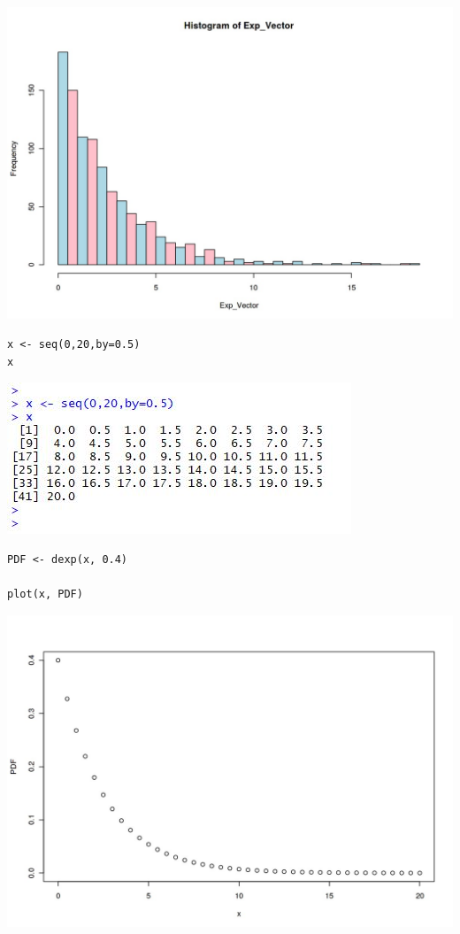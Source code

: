 \documentclass[a4paper,12pt]{article}
\begin{document}
\includegraphics[scale=0.40]{00-A2/images/output_14_0.jpeg}

\newpage 

\begin{framed} \begin{verbatim}
x <- seq(0,20,by=0.5)
x
\end{verbatim}\end{framed}

\includegraphics[]{00-A2/images/Sequence.JPG}

\newpage 

\begin{framed} \begin{verbatim}
PDF <- dexp(x, 0.4)

plot(x, PDF)

\end{verbatim}\end{framed}


\includegraphics[scale=0.4]{00-A2/images/output_16_0.jpeg}
\end{document}
